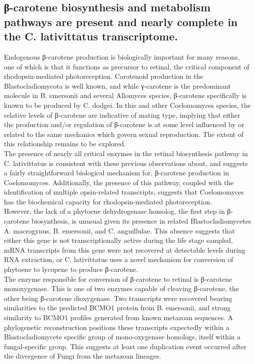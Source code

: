 \subsection{β-carotene biosynthesis and metabolism pathways are present and nearly complete in the C. lativittatus transcriptome.}
Endogenous β-carotene production is biologically important for many reasons, one of which is that it functions as precursor to retinal, the critical component of rhodopsin-mediated photoreception. Carotenoid production in the Blastocladiomycota is well known, and while γ-carotene is the predominant molecule in B. emersonii and several Allomyces species, β-carotene specifically is known to be produced by C. dodgei. In this and other Coelomomyces species, the relative levels of β-carotene are indicative of mating type, implying that either the production and/or regulation of β-carotene is at some level influenced by or related to the same mechanics which govern sexual reproduction. The extent of this relationship remains to be explored. \\
\indent The presence of nearly all critical enzymes in the retinal biosynthesis pathway in C. lativittatus is consistent with these previous observations about, and suggests a fairly straightforward biological mechanism for, β-carotene production in Coelomomyces. Additionally, the presence of this pathway, coupled with the identification of multiple opsin-related transcripts, suggests that Coelomomyces has the biochemical capacity for rhodopsin-mediated photoreception. \\
\indent However, the lack of a phytoene dehydrogenase homolog, the first step in β-carotene biosynthesis, is unusual given its presence in related Blastocladiomycetes A. macrogynus, B. emersonii, and C. anguillulae. This absence suggests that either this gene is not transcriptionally active during the life stage sampled, mRNA transcripts from this gene were not recovered at detectable levels during RNA extraction, or C. lativittatus uses a novel mechanism for conversion of phytoene to lycopene to produce β-carotene. \\
\indent The enzyme responsible for conversion of β-carotene to retinal is β-carotene monoxygenase. This is one of two enzymes capable of cleaving β-carotene, the other being β-carotene dioxygenase. Two transcripts were recovered bearing similarities to the predicted BCMO1 protein from  B. emersonii, and strong similarity to BCMO1 profiles generated from known metazoan sequences. A phylogenetic reconstruction positions these transcripts expectedly within a Blastocladiomycete specific group of mono-oxygenase homologs, itself within a fungal-specific group. This suggests at least one duplication event occurred after the divergence of Fungi from the metazoan lineages. \\
